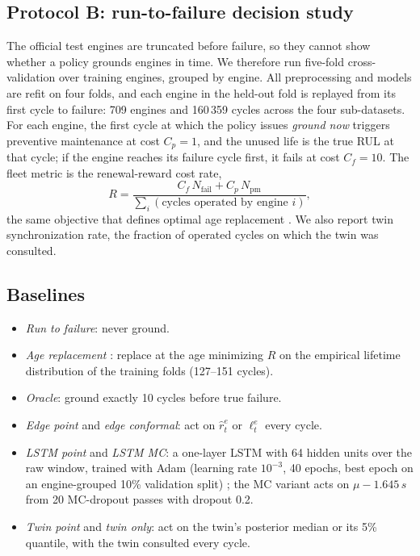 \documentclass[preprint,12pt,authoryear]{elsarticle}
\begin{document}
\subsection{Protocol B: run-to-failure decision study}
The official test engines are truncated before failure, so they cannot show whether a policy grounds engines in time. We therefore run five-fold cross-validation over training engines, grouped by engine. All preprocessing and models are refit on four folds, and each engine in the held-out fold is replayed from its first cycle to failure: 709 engines and 160\,359 cycles across the four sub-datasets. For each engine, the first cycle at which the policy issues \emph{ground now} triggers preventive maintenance at cost $C_p = 1$, and the unused life is the true RUL at that cycle; if the engine reaches its failure cycle first, it fails at cost $C_f = 10$. The fleet metric is the renewal-reward cost rate,
\begin{equation}
R = \frac{C_f\,N_{\mathrm{fail}} + C_p\,N_{\mathrm{pm}}}{\sum_i (\text{cycles operated by engine } i)},
\end{equation}
the same objective that defines optimal age replacement \citep{barlow1960optimum}. We also report twin synchronization rate, the fraction of operated cycles on which the twin was consulted.

\subsection{Baselines}
\begin{itemize}
\item \emph{Run to failure}: never ground.
\item \emph{Age replacement} \citep{barlow1960optimum}: replace at the age minimizing $R$ on the empirical lifetime distribution of the training folds (127--151 cycles).
\item \emph{Oracle}: ground exactly 10 cycles before true failure.
\item \emph{Edge point} and \emph{edge conformal}: act on $\hat r^{e}_t$ or $\ell^{e}_t$ every cycle.
\item \emph{LSTM point} and \emph{LSTM MC}: a one-layer LSTM \citep{hochreiter1997lstm,zheng2017lstm} with 64 hidden units over the raw window, trained with Adam (learning rate $10^{-3}$, 40 epochs, best epoch on an engine-grouped 10\% validation split) \citep{paszke2019pytorch}; the MC variant acts on $\mu - 1.645\,s$ from 20 MC-dropout passes \citep{gal2016dropout} with dropout 0.2.
\item \emph{Twin point} and \emph{twin only}: act on the twin's posterior median or its 5\% quantile, with the twin consulted every cycle.
\end{itemize}
\end{document}
